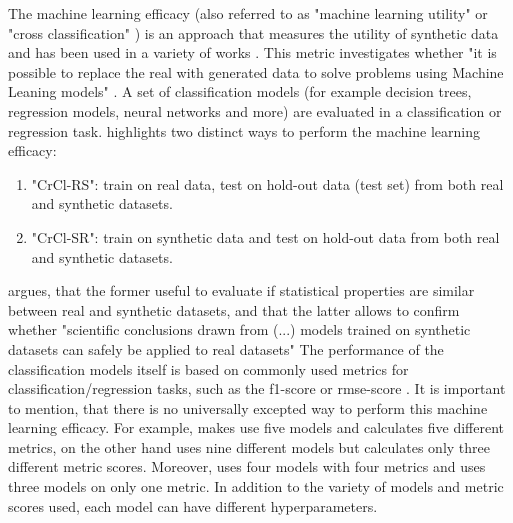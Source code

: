 The machine learning efficacy (also referred to as "machine learning utility"\cite{zhang2021GANBLRTabularData} or "cross classification" \cite{goncalves2020GenerationEvaluationSynthetic}) is an approach that measures the utility of synthetic data and has been used in a variety of works \cite{zhao2022CTABGANEnhancingTabular, xu2019ModelingTabularData, zhang2021GANBLRTabularData, bourou2021ReviewTabularData, ge2021KaminoConstraintawareDifferentially}.
This metric investigates whether "it is possible to replace the real with generated data to solve problems using Machine Leaning models" \cite[p. 7]{bourou2021ReviewTabularData}.
A set of classification models (for example decision trees, regression models, neural networks and more) are evaluated in a classification or regression task.
\cite[p. 7]{goncalves2020GenerationEvaluationSynthetic} highlights two distinct ways to perform the machine learning efficacy:
\begin{enumerate}
  \item "CrCl-RS": train on real data, test on hold-out data (test set) from both real and synthetic datasets.
  \item "CrCl-SR": train on synthetic data and test on hold-out data from both real and synthetic datasets.
\end{enumerate}
\cite{goncalves2020GenerationEvaluationSynthetic} argues, that the former useful to evaluate if statistical properties are similar between real and synthetic datasets,
and that the latter allows to confirm whether "scientific conclusions drawn from (...) models trained on synthetic datasets can safely be applied to real datasets" \cite[p. 7]{goncalves2020GenerationEvaluationSynthetic}
The performance of the classification models itself is based on commonly used metrics for classification/regression tasks, such as the f1-score or \gls{rmse}-score \cite{bourou2021ReviewTabularData, chundawat2022UniversalMetricRobust}.
It is important to mention, that there is no universally excepted way to perform this machine learning efficacy.
For example, \cite{zhao2022CTABGANEnhancingTabular} makes use five models and calculates five different metrics, 
\cite{ge2021KaminoConstraintawareDifferentially} on the other hand uses nine different models but calculates only three different metric scores.
Moreover, \cite{kunar2021DTGANDifferentialPrivatea} uses four models with four metrics and \cite{kim2021OCTGANNeuralODEbased} uses three models on only one metric.
In addition to the variety of models and metric scores used, each model can have different hyperparameters.
